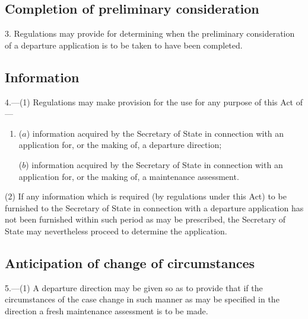 \documentclass[a4paper]{article}
\begin{document}
{\subsection*{Completion of preliminary consideration}

3. Regulations may provide for determining when the preliminary consideration of a departure application is to be taken to have been completed.

\subsection*{Information}

4.—(1) Regulations may make provision for the use for any purpose of this Act of---
\begin{enumerate}\item[]
($a$) information acquired by the Secretary of State in connection with an
application for, or the making of, a departure direction;

($b$) information acquired by the Secretary of State in connection with
an application for, or the making of, a maintenance assessment.
\end{enumerate}

(2) If any information which is required (by regulations under this Act) to be furnished to the Secretary of State in connection with a departure application has not been furnished within such period as may be prescribed, the Secretary of State may nevertheless proceed to determine the application.


\subsection*{Anticipation of change of circumstances}

5.—(1) A departure direction may be given so as to provide that if the circumstances of the case change in such manner as may be specified in the direction a fresh maintenance assessment is to be made.

}
\end{document}
